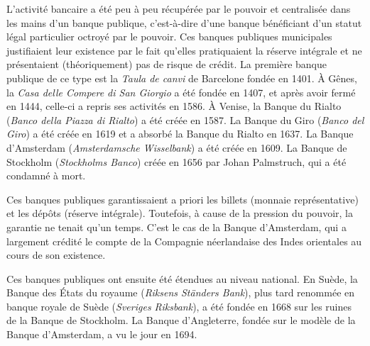 \documentclass[a4paper,notitlepage]{article}
\newcommand{\eng}[1]{{\NoAutoSpaceBeforeFDP\emph{#1}}}  %
\begin{document}
L'activité bancaire a été peu à peu récupérée par le pouvoir et centralisée dans les mains d'un banque publique, c'est-à-dire d'une banque bénéficiant d'un statut légal particulier octroyé par le pouvoir. Ces banques publiques municipales justifiaient leur existence par le fait qu'elles pratiquaient la réserve intégrale et ne présentaient (théoriquement) pas de risque de crédit. La première banque publique de ce type est la \emph{Taula de canvi} de Barcelone fondée en 1401. À Gênes, la \emph{Casa delle Compere di San Giorgio} a été fondée en 1407, et après avoir fermé en 1444, celle-ci a repris ses activités en 1586. À Venise, la Banque du Rialto (\emph{Banco della Piazza di Rialto}) a été créée en 1587. La Banque du Giro (\emph{Banco del Giro}) a été créée en 1619 et a absorbé la Banque du Rialto en 1637. La Banque d'Amsterdam (\eng{Amsterdamsche Wisselbank}) a été créée en 1609. La Banque de Stockholm (\eng{Stockholms Banco}) créée en 1656 par Johan Palmstruch, qui a été condamné à mort.

Ces banques publiques garantissaient a priori les billets (monnaie représentative) et les dépôts (réserve intégrale). Toutefois, à cause de la pression du pouvoir, la garantie ne tenait qu'un temps. C'est le cas de la Banque d'Amsterdam, qui a largement crédité le compte de la Compagnie néerlandaise des Indes orientales au cours de son existence.

Ces banques publiques ont ensuite été étendues au niveau national. En Suède, la Banque des États du royaume (\eng{Riksens Ständers Bank}), plus tard renommée en banque royale de Suède (\eng{Sveriges Riksbank}), a été fondée en 1668 sur les ruines de la Banque de Stockholm. La Banque d'Angleterre, fondée sur le modèle de la Banque d'Amsterdam, a vu le jour en 1694.


\end{document}

